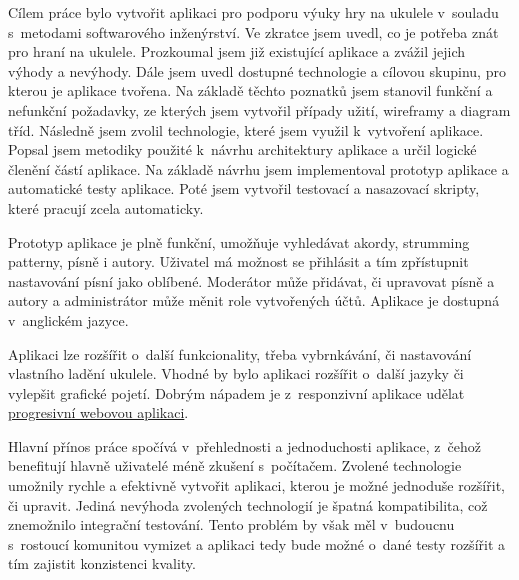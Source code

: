 \begin{conclusion}
    Cílem práce bylo vytvořit aplikaci pro podporu výuky hry na ukulele v~souladu s~metodami softwarového inženýrství. Ve zkratce jsem uvedl, co je potřeba znát pro hraní na ukulele. Prozkoumal jsem již existující aplikace a zvážil jejich výhody a nevýhody. Dále jsem uvedl dostupné technologie a cílovou skupinu, pro kterou je aplikace tvořena. Na základě těchto poznatků jsem stanovil funkční a nefunkční požadavky, ze kterých jsem vytvořil případy užití, wireframy a diagram tříd. Následně jsem zvolil technologie, které jsem využil k~vytvoření aplikace. Popsal jsem metodiky použité k~návrhu architektury aplikace a určil logické členění částí aplikace. Na základě návrhu jsem implementoval prototyp aplikace a automatické testy aplikace. Poté jsem vytvořil testovací a nasazovací skripty, které pracují zcela automaticky.

    Prototyp aplikace je plně funkční, umožňuje vyhledávat akordy, strumming patterny, písně i autory. Uživatel má možnost se přihlásit a tím zpřístupnit nastavování písní jako oblíbené. Moderátor může přidávat, či upravovat písně a autory a administrátor může měnit role vytvořených účtů. Aplikace je dostupná v~anglickém jazyce.

    Aplikaci lze rozšířit o~další funkcionality, třeba vybrnkávání, či nastavování vlastního ladění ukulele. Vhodné by bylo aplikaci rozšířit o~další jazyky či vylepšit grafické pojetí. Dobrým nápadem je z~responzivní aplikace udělat \hyperref[sss:pwa]{progresivní webovou aplikaci}.

    Hlavní přínos práce spočívá v~přehlednosti a jednoduchosti aplikace, z~čehož benefitují hlavně uživatelé méně zkušení s~počítačem. Zvolené technologie umožnily rychle a efektivně vytvořit aplikaci, kterou je možné jednoduše rozšířit, či upravit. Jediná nevýhoda zvolených technologií je špatná kompatibilita, což znemožnilo integrační testování. Tento problém by však měl v~budoucnu s~rostoucí komunitou vymizet a aplikaci tedy bude možné o~dané testy rozšířit a tím zajistit konzistenci kvality.
\end{conclusion}